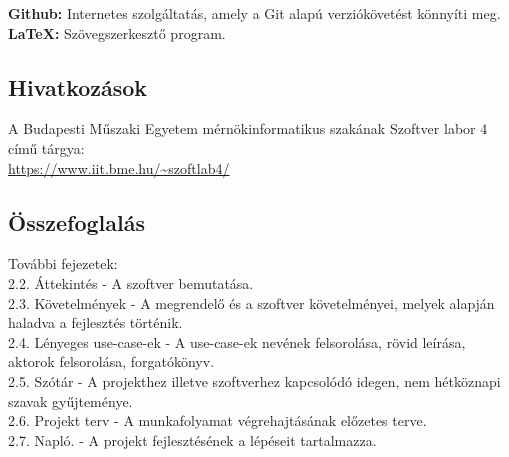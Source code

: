 \noindent\textbf{Github:} Internetes szolgáltatás, amely a Git alapú verziókövetést könnyíti meg.\\

\noindent\textbf{LaTeX:} Szövegszerkesztő program.


\subsection{Hivatkozások}

A Budapesti Műszaki Egyetem mérnökinformatikus szakának Szoftver labor 4 című tárgya:  \\
\url{https://www.iit.bme.hu/~szoftlab4/}


\subsection{Összefoglalás}

 További fejezetek:\\

 2.2. Áttekintés - A szoftver bemutatása.\\

 2.3. Követelmények - A megrendelő és a szoftver követelményei, melyek alapján haladva a fejlesztés történik.\\

 2.4. Lényeges use-case-ek - A use-case-ek nevének felsorolása, rövid leírása, aktorok felsorolása, forgatókönyv.\\

 2.5. Szótár - A projekthez illetve szoftverhez kapcsolódó idegen, nem hétköznapi szavak gyűjteménye.\\

 2.6. Projekt terv - A munkafolyamat végrehajtásának előzetes terve.\\

 2.7. Napló. - A projekt fejlesztésének a lépéseit tartalmazza.